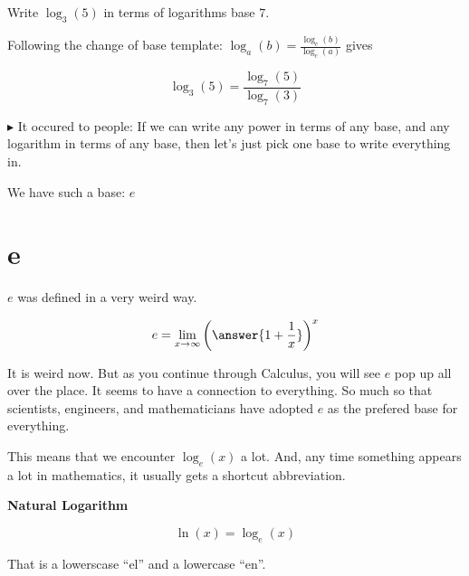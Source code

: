 \documentclass{ximera}
\begin{document}
\begin{example}


Write $\log_3(5)$ in terms of logarithms base $7$.


\begin{explanation}


Following the change of base template: $\log_a(b)  =  \frac{\log_c(b)}{\log_c(a)} $ gives



\[   \log_3(5)  =  \frac{\log_7(5)}{\log_7(3)}         \]



\end{explanation}
\end{example}


















$\blacktriangleright$ It occured to people: If we can write any power in terms of any base, and any logarithm in terms of any base, then let's just pick one base to write everything in.


We have such a base: $e$


\section{e}



\begin{fact} $e$ was defined in a very weird way.

\[   e = \lim_{x \to \infty}  \left(\answer{1 + \frac{1}{x}}\right)^x      \]

\end{fact}




It is weird now.  But as you continue through Calculus, you will see $e$ pop up all over the place.  It seems to have a connection to everything.  So much so that scientists, engineers, and mathematicians have  adopted $e$ as the prefered base for everything.


This means that we encounter $\log_e(x)$ a lot.  And, any time something appears a lot in mathematics, it usually gets a shortcut abbreviation.




\begin{definition}  \textbf{\textcolor{green!50!black}{Natural Logarithm}} 


\[     \ln(x) = \log_e(x) \]


That is a lowerscase ``el'' and a lowercase ``en''.


\end{definition}
\end{document}
